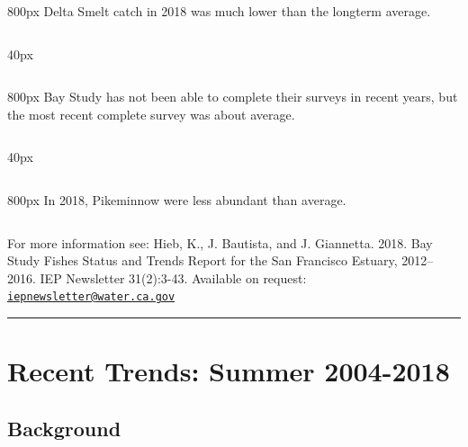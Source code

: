 \documentclass[
]{book}
\begin{document}
\begin{column}{800px\textwidth}
Delta Smelt catch in 2018 was much lower than the longterm average.
\end{column}

\begin{column}{40px\textwidth}
~
\end{column}

\begin{column}{800px\textwidth}
Bay Study has not been able to complete their surveys in recent years, but the most recent complete survey was about average.
\end{column}

\begin{column}{40px\textwidth}
~
\end{column}

\begin{column}{800px\textwidth}
In 2018, Pikeminnow were less abundant than average.
\end{column}

\begin{disclaimer}
For more information see: Hieb, K., J. Bautista, and J. Giannetta. 2018.
Bay Study Fishes Status and Trends Report for the San Francisco Estuary,
2012--2016. IEP Newsletter 31(2):3-43. Available on request:
\href{mailto:iepnewsletter@water.ca.gov}{\nolinkurl{iepnewsletter@water.ca.gov}}
\end{disclaimer}

\begin{center}\rule{0.5\linewidth}{0.5pt}\end{center}

\hypertarget{recent-trends-summer-2004-2018}{%
\section{Recent Trends: Summer 2004-2018}\label{recent-trends-summer-2004-2018}}

\hypertarget{background-11}{%
\subsection{Background}\label{background-11}}
\end{document}
